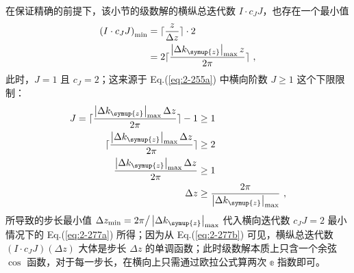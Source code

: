 在保证精确的前提下，该小节的级数解的横纵总迭代数 $I \cdot c_J J$，也存在一个最小值
\begin{subequations} \label{eq:2-279}
	\abovedisplayskip=13pt
	\belowdisplayskip=13pt
	\begin{align}
		\left( I \cdot c_J J \right)_{\min} &= \lceil \frac{z}{\Delta z} \rceil \cdot 2 \label{eq:2-279a} \\ &= 2 \lceil \frac{\left| \Delta k_{\symup{z}} \right|_{\max} z}{2 \pi} \rceil \label{eq:2-279b} ~,
	\end{align}
\end{subequations}
此时，$J = 1$ 且 $c_J = 2$；这来源于 Eq.(\ref{eq:2-255a}) 中横向阶数 $J \geq 1$ 这个下限限制：
\begin{subequations} \label{eq:2-280}
	\abovedisplayskip=13pt
	\belowdisplayskip=13pt
	\begin{align}
		J = \lceil \frac{ \left| \Delta k_{\symup{z}} \right|_{\max} \Delta z }{ 2 \pi } \rceil - 1 &\geq 1 \label{eq:2-280a} \\ \lceil \frac{ \left| \Delta k_{\symup{z}} \right|_{\max} \Delta z }{ 2 \pi } \rceil &\geq 2 \label{eq:2-280b} \\ \frac{ \left| \Delta k_{\symup{z}} \right|_{\max} \Delta z }{ 2 \pi } &\geq 1 \label{eq:2-280c} \\ \Delta z &\geq \frac{ 2 \pi }{ \left| \Delta k_{\symup{z}} \right|_{\max} } \label{eq:2-280d} ~,
	\end{align}
\end{subequations}
所导致的步长最小值 $\Delta z_{\min} = 2 \pi \big/ \left| \Delta k_{\symup{z}} \right|_{\max}$ 代入横向迭代数 $c_J J = 2$ 最小情况下的 Eq.(\ref{eq:2-277a}) 所得；因为从 Eq.(\ref{eq:2-277b}) 可见，横纵总迭代数 $\left( I \cdot c_J J \right) \left( \Delta z \right)$ 大体是步长 $\Delta z$ 的单调函数；此时级数解本质上只含一个余弦 $\cos$ 函数，对于每一步长，在横向上只需通过欧拉公式算两次 $\mathbb{e}$ 指数即可。

